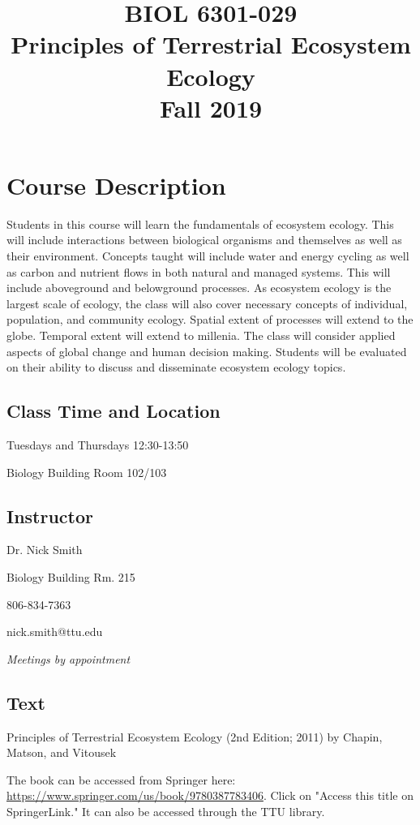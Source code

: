\documentclass[12pt, notitlepage]{article}   	%
\title{
	\textbf{
		BIOL 6301-029
	} \\
	\large Principles of Terrestrial Ecosystem Ecology \\
	\large Fall 2019
}
\date{\vspace{-5ex}}
\begin{document}
{\selectfont %

\maketitle

\section{Course Description}
Students in this course will learn the fundamentals of ecosystem ecology.
This will include interactions between biological organisms and themselves as well as
their environment. Concepts taught will include water and energy cycling as well as carbon
and nutrient flows in both natural and managed systems.
This will include aboveground and belowground processes.
As ecosystem ecology is the largest scale of ecology, the class will also cover necessary
concepts of individual, population, and community ecology.
Spatial extent of processes will extend to the globe. Temporal extent will extend to 
millenia. The class will consider applied aspects of global change and human decision making.
Students will be evaluated on their 
ability to discuss and disseminate ecosystem ecology topics.

\subsection{Class Time and Location}
Tuesdays and Thursdays 12:30-13:50

Biology Building Room 102/103

\subsection{Instructor}
Dr. Nick Smith \par
Biology Building Rm. 215 \par
806-834-7363 \par
nick.smith@ttu.edu \par
\textit{Meetings by appointment}

\subsection{Text}
Principles of Terrestrial Ecosystem Ecology (2nd Edition; 2011) 
by Chapin, Matson, and Vitousek \par
The book can be accessed from Springer here: 
\url{https://www.springer.com/us/book/9780387783406}. Click on "Access this title on 
SpringerLink." It can also be accessed through the TTU library.

}
\end{document}
